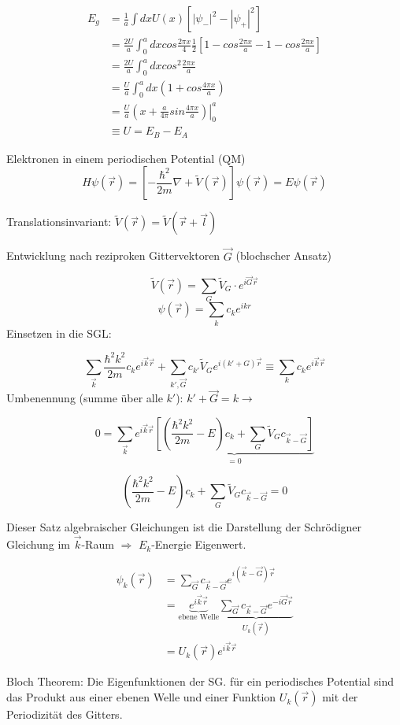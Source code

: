 \begin{align}
E_g &= \frac{1}{a}\int dx U(x)[|\psi_-|^2-|\psi_+|^2]\\
&=\frac{2U}{a}\int_0^a dx cos\frac{2\pi x}{4}\frac{1}{2}[1-cos\frac{2\pi x}{a}-1-cos\frac{2\pi x}{a}]\\
&= \frac{2U}{a}\int_0^a dx cos^2\frac{2\pi x}{a}\\
&= \frac{U}{a}\int_0^a dx (1+cos\frac{4\pi x}{a})\\
&=\frac{U}{a}\left.(x+\frac{a}{4\pi}sin\frac{4\pi x}{a})\right|_0^a \\
&\equiv U = E_B-E_A
\end{align}


Elektronen in einem periodischen Potential (QM)
\[ H\psi(\vec r) = [-\frac{\hbar^2}{2m}\nabla+\tilde V(\vec r) ]\psi (\vec r) = E\psi(\vec r) \]

Translationsinvariant: \(\tilde V(\vec r) = \tilde V(\vec r+\vec l)\)

Entwicklung nach reziproken Gittervektoren \(\vec G\) (blochscher Ansatz)

\[\tilde V(\vec r) = \sum_G\tilde V_G\cdot e^{i\vec G\vec r}\]
\[\psi(\vec r) = \sum_{k}c_ke^{ikr}\]
Einsetzen in die SGL:

\[\sum_{\vec k}\frac{\hbar^2 k^2}{2m}c_ke^{i\vec k\vec r}+\sum_{k',\vec G}c_{k'}\tilde V_G e^{i(k'+G)\vec r}\equiv \sum_kc_ke^{i\vec k\vec r}\]
Umbenennung (summe über alle \(k'\)): \(k'+\vec G = k \rightarrow \)

\[0=\sum_{\vec k}e^{i\vec k\vec r}\underbrace{\left[(\frac{\hbar^2 k^2}{2m}-E)c_k+\sum_G\tilde V_G c_{\vec k-\vec G}\right]}_{=0}\]


\[(\frac{\hbar^2 k^2}{2m}-E)c_k+\sum_G\tilde V_G c_{\vec k-\vec G}=0\]

Dieser Satz algebraischer Gleichungen ist die Darstellung der Schrödigner Gleichung im \(\vec k\)-Raum \(\Rightarrow\) \(E_k\)-Energie Eigenwert.

\begin{align}
\psi_k(\vec r) &= \sum_{\vec G}c_{\vec k-\vec G}e^{i(\vec k-\vec G)\vec r}\\
&= \underbrace{e^{i\vec k\vec r}}_{\text{ebene Welle}}\underbrace{\sum_{\vec G}c_{\vec k-\vec G}e^{-i\vec G\vec r}}_{U_k(\vec r)}\\
&= U_k(\vec r)e^{i\vec k\vec r}
\end{align}

Bloch Theorem: Die Eigenfunktionen der SG. für ein periodisches Potential sind das Produkt aus einer ebenen Welle und einer Funktion \(U_k(\vec r)\) mit der Periodizität des Gitters. 


